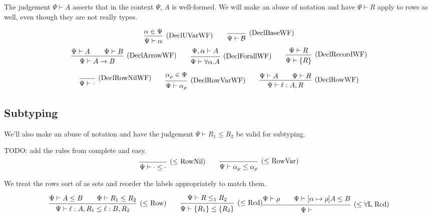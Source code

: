 \documentclass{article}
\newcommand{\rcd}[1]{\{#1\}}
\newcommand{\B}{\mathcal{B}}
\newcommand{\rowvar}{\alpha_\rho}
\newcommand{\spc}{\qquad}
\newcommand{\wf}[2]{#1 \vdash #2}
\newcommand{\subtype}{\le}
\newcommand{\subtypes}[3]{#1 \vdash #2 \le #3}
\newcommand{\deduct}[3][]
{
  \begin{prooftree}
    \hypo{#2}
    \infer1[\text{#1}]{#3}
  \end{prooftree}
}
\begin{document}
The judgement \(\wf \Psi A\) asserts that in the context \(\Psi\), \(A\) is
well-formed. We will make an abuse of notation and have \(\wf \Psi R\) apply to
rows as well, even though they are not really types.

\[
  \deduct[(DeclUVarWF)]
  {\alpha \in \Psi}
  {\wf{\Psi}{\alpha}}
  \spc
  \deduct[(DeclBaseWF)]
  {}
  {\wf{\Psi}{\B}}
\]
\[
  \deduct[(DeclArrowWF)]
  {\wf \Psi A \spc \wf \Psi B}
  {\wf \Psi {A \to B}}
  \spc
  \deduct[(DeclForallWF)]
  {\wf{\Psi, \alpha}{A}}
  {\wf \Psi {\forall \alpha. A}}
  \spc
  \deduct[(DeclRecordWF)]
  {\wf \Psi R}
  {\wf \Psi {\rcd{R}}}
\]

\[
  \deduct[(DeclRowNilWF)]
  {}
  {\wf \Psi \cdot}
  \spc
  \deduct[(DeclRowVarWF)]
  {\rowvar \in \Psi}
  {\wf \Psi \rowvar}
  \spc
  \deduct[(DeclRowWF)]
  {\wf \Psi A \spc \wf \Psi R}
  {\wf \Psi {\ell : A, R}}
\]


\subsection{Subtyping}
We'll also make an abuse of notation and have the judgement \(\subtypes{\Psi}{R_1}{R_2}\) be valid for subtyping.

TODO: add the rules from complete and easy.
\[
  \deduct[(\(\subtype\) RowNil)]
  {}
  {\subtypes{\Psi}{\cdot}{\cdot}}
  \spc
  \deduct[(\(\subtype\) RowVar)]
  {}
  {\subtypes{\Psi}{\rowvar}{\rowvar}}
\]

We treat the rows sort of as sets and reorder the labels appropriately to match
them.

\[
  \deduct[(\(\subtype\) Row)]
  {\subtypes{\Psi}{A}{B} \spc \subtypes{\Psi}{R_1}{R_2}}
  {\subtypes \Psi {\ell : A, R_1}{\ell : B, R_2}}
  \spc
  \deduct[(\(\subtype\) \text{Rcd})]
  {\subtypes \Psi R_1 R_2}
  {\subtypes {\Psi} {\rcd{R_1}} {\rcd{R_2}}}
  \deduct[(\(\subtype\forall\)L Rcd)]
  {\wf \Psi \rho \spc \subtypes \Psi {[\alpha \mapsto \rho]A} B }
  {\wf \Psi }
\]
\end{document}
